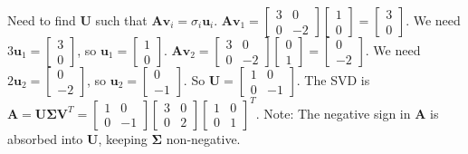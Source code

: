 \documentclass{article}
\newcommand{\vect}[1]{\bm{#1}} %
\newcommand{\mat}[1]{\bm{#1}}  %
\begin{document}
\begin{enumerate}
    Need to find $\mat{U}$ such that $\mat{A}\vect{v}_i = \sigma_i \vect{u}_i$.
    $\mat{A}\vect{v}_1 = \begin{bmatrix} 3 & 0 \\ 0 & -2 \end{bmatrix} \begin{bmatrix} 1 \\ 0 \end{bmatrix} = \begin{bmatrix} 3 \\ 0 \end{bmatrix}$. We need $3 \vect{u}_1 = \begin{bmatrix} 3 \\ 0 \end{bmatrix}$, so $\vect{u}_1 = \begin{bmatrix} 1 \\ 0 \end{bmatrix}$.
    $\mat{A}\vect{v}_2 = \begin{bmatrix} 3 & 0 \\ 0 & -2 \end{bmatrix} \begin{bmatrix} 0 \\ 1 \end{bmatrix} = \begin{bmatrix} 0 \\ -2 \end{bmatrix}$. We need $2 \vect{u}_2 = \begin{bmatrix} 0 \\ -2 \end{bmatrix}$, so $\vect{u}_2 = \begin{bmatrix} 0 \\ -1 \end{bmatrix}$.
    So $\mat{U} = \begin{bmatrix} 1 & 0 \\ 0 & -1 \end{bmatrix}$.
    The SVD is $\mat{A} = \mat{U}\mat{\Sigma}\mat{V}^T = \begin{bmatrix} 1 & 0 \\ 0 & -1 \end{bmatrix} \begin{bmatrix} 3 & 0 \\ 0 & 2 \end{bmatrix} \begin{bmatrix} 1 & 0 \\ 0 & 1 \end{bmatrix}^T$.
    Note: The negative sign in $\mat{A}$ is absorbed into $\mat{U}$, keeping $\mat{\Sigma}$ non-negative.
\end{enumerate}
\end{document}
